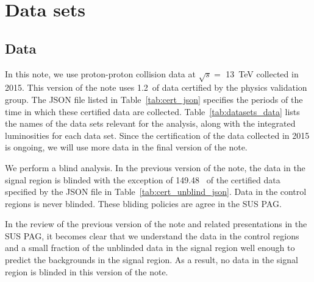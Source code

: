 \section{Data sets}
\label{sec:datasets}

\subsection{Data}


In this note, we use proton-proton collision data at $\sqrt{s} =$
13~TeV collected in 2015. This version of the note uses 1.2~\ifb of
data certified by the physics validation group. The JSON file listed
in Table~\ref{tab:cert_json} specifies the periods of the time in
which these certified data are collected.
Table~\ref{tab:datasets_data} lists the names of the data sets
relevant for the analysis, along with the integrated luminosities for
each data set. Since the certification of the data collected in 2015
is ongoing, we will use more data in the final version of the note.

We perform a blind analysis. In the previous version of the note, the
data in the signal region is blinded with the exception of 149.48~\ipb
of the certified data specified by the JSON file in
Table~\ref{tab:cert_unblind_json}. Data in the control regions is
never blinded. These bliding policies are agree in the SUS PAG.

In the review of the previous version of the note and related
presentations in the SUS PAG, it becomes clear that we understand the
data in the control regions and a small fraction of the unblinded data
in the signal region well enough to predict the backgrounds in the
signal region. As a result, no data in the signal region is blinded in
this version of the note.

\begin{table}[!h]
 \footnotesize
 \label{tab:cert_json}
\end{table}

\begin{table}[!h]
\footnotesize 
\label{tab:datasets_data}
\end{table}

\begin{table}[!h]
 \footnotesize

\label{tab:cert_unblind_json}
\end{table}

